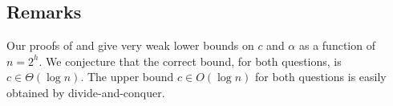 \documentclass{patmorin}
\begin{document}
\subsection{Remarks}

Our proofs of  and  give very weak lower
bounds on $c$ and $\alpha$ as a function of $n=2^h$.  We conjecture
that the correct bound, for both questions, is $c\in \Theta(\log n)$.
The upper bound $c\in O(\log n)$ for both questions is easily obtained
by divide-and-conquer.



\end{document}
